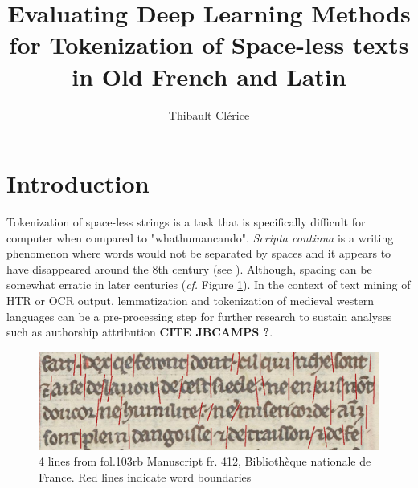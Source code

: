 \documentclass{jdmdh}
\title{Evaluating Deep Learning Methods for Tokenization of Space-less texts in Old French and Latin}
\author[1]{Thibault Clérice}
\affil[1]{École nationale des Chartes, France}
\affil[2]{Université Lyon 3, France}
\begin{document}
\maketitle



\section{Introduction}


Tokenization of space-less strings is a task that is specifically difficult for computer when compared to "whathumancando". \textit{Scripta continua} is a writing phenomenon where words would not be separated by spaces and it appears to have disappeared around the 8th century (see \citet{zanna1998lecture}). Although, spacing can be somewhat erratic in later centuries (\textit{cf.} Figure \ref{fig:4lines}). In the context of text mining of HTR or OCR output, lemmatization and tokenization of medieval western languages can be a pre-processing step for further research to sustain analyses such as authorship attribution \textbf{CITE JBCAMPS ?}.

\begin{figure}
  \centering
  \includegraphics[width=\linewidth]{4-lines-p0215.png}

  \caption{ 4 lines from fol.103rb Manuscript fr. 412, Bibliothèque nationale de France.  Red lines indicate word boundaries}
  \label{fig:4lines}
\end{figure}
\end{document}
